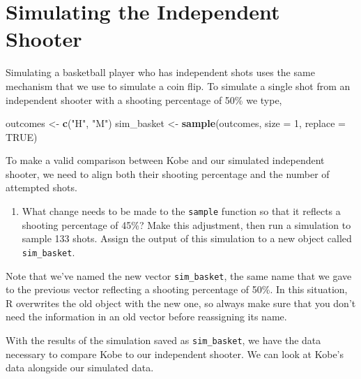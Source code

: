 \documentclass[]{book}
\newenvironment{Shaded}{\begin{snugshade}}{\end{snugshade}}
\newcommand{\KeywordTok}[1]{\textcolor[rgb]{0.13,0.29,0.53}{\textbf{{#1}}}}
\newcommand{\DataTypeTok}[1]{\textcolor[rgb]{0.13,0.29,0.53}{{#1}}}
\newcommand{\DecValTok}[1]{\textcolor[rgb]{0.00,0.00,0.81}{{#1}}}
\newcommand{\StringTok}[1]{\textcolor[rgb]{0.31,0.60,0.02}{{#1}}}
\newcommand{\OtherTok}[1]{\textcolor[rgb]{0.56,0.35,0.01}{{#1}}}
\newcommand{\NormalTok}[1]{{#1}}
\providecommand{\tightlist}{%
  \setlength{\itemsep}{0pt}\setlength{\parskip}{0pt}}
\theoremstyle{definition}
\theoremstyle{definition}
\theoremstyle{remark}
\begin{document}
\section*{Simulating the Independent
Shooter}\label{simulating-the-independent-shooter}

Simulating a basketball player who has independent shots uses the same
mechanism that we use to simulate a coin flip. To simulate a single shot
from an independent shooter with a shooting percentage of 50\% we type,

\begin{Shaded}
\begin{Highlighting}[]
\NormalTok{outcomes <-}\StringTok{ }\KeywordTok{c}\NormalTok{(}\StringTok{"H"}\NormalTok{, }\StringTok{"M"}\NormalTok{)}
\NormalTok{sim_basket <-}\StringTok{ }\KeywordTok{sample}\NormalTok{(outcomes, }\DataTypeTok{size =} \DecValTok{1}\NormalTok{, }\DataTypeTok{replace =} \OtherTok{TRUE}\NormalTok{)}
\end{Highlighting}
\end{Shaded}

To make a valid comparison between Kobe and our simulated independent
shooter, we need to align both their shooting percentage and the number
of attempted shots.

\begin{enumerate}
\def\labelenumi{\arabic{enumi}.}
\setcounter{enumi}{3}
\tightlist
\item
  What change needs to be made to the \texttt{sample} function so that
  it reflects a shooting percentage of 45\%? Make this adjustment, then
  run a simulation to sample 133 shots. Assign the output of this
  simulation to a new object called \texttt{sim\_basket}.
\end{enumerate}

Note that we've named the new vector \texttt{sim\_basket}, the same name
that we gave to the previous vector reflecting a shooting percentage of
50\%. In this situation, R overwrites the old object with the new one,
so always make sure that you don't need the information in an old vector
before reassigning its name.

With the results of the simulation saved as \texttt{sim\_basket}, we
have the data necessary to compare Kobe to our independent shooter. We
can look at Kobe's data alongside our simulated data.

\begin{Shaded}
\end{Shaded}
\end{document}
